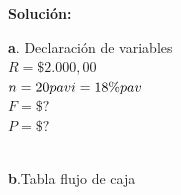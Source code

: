 \vspace{2mm}

\textbf{Solución:}

\vspace{2mm}

\textbf{a}. Declaración de variables\\

	    $R=\$2.000,00$\\
	$	n=20 pav 
		\\
		i=18\% pav $
		\\
		$F=\$?$
		\\
		$P=\$?$
		\\
	
	\\
	
	\clearpage

\textbf{b}.Tabla flujo de caja
\\

